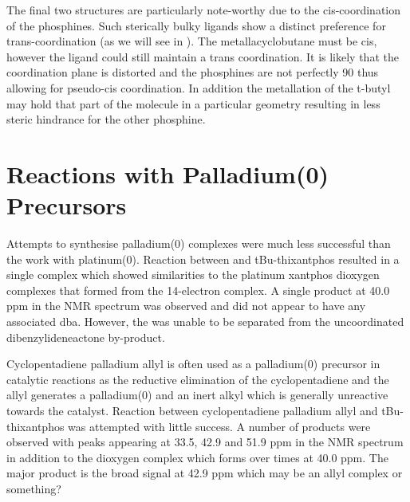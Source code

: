 The final two structures are particularly note-worthy due to the cis-coordination of the phosphines.  Such sterically bulky ligands show a distinct preference for trans-coordination (as we will see in ).  The metallacyclobutane must be cis, however the ligand could still maintain a trans coordination.  It is likely that the coordination plane is distorted and the phosphines are not perfectly 90 \degrees{} thus allowing for pseudo-cis coordination.  In addition the metallation of the t-butyl may hold that part of the molecule in a particular geometry resulting in less steric hindrance for the other phosphine.  





\section{Reactions with Palladium(0) Precursors}

Attempts to synthesise palladium(0) complexes were much less successful than the work with platinum(0).  Reaction between  and tBu-thixantphos resulted in a single complex which showed similarities to the platinum xantphos dioxygen complexes that formed from the 14-electron complex.  A single product at 40.0 ppm in the \phosphorus{} NMR spectrum was observed and did not appear to have any associated dba.  However, the was unable to be separated from the uncoordinated dibenzylideneactone by-product. 

Cyclopentadiene palladium allyl is often used as a palladium(0) precursor in catalytic reactions as the reductive elimination of the cyclopentadiene and the allyl generates a palladium(0) and an inert  alkyl which is generally unreactive towards the catalyst.  Reaction between cyclopentadiene palladium allyl and tBu-thixantphos was attempted with little success.  A number of products were observed with peaks appearing at 33.5, 42.9 and 51.9 ppm in the \phosphorus{} NMR spectrum in addition to the dioxygen complex which forms over times at 40.0 ppm.  The major product is the broad signal at 42.9 ppm which may be an allyl complex or something?

